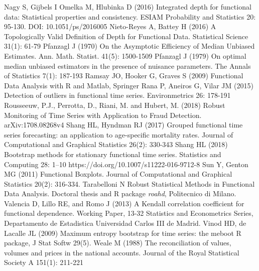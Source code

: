 \documentclass[12pt,a4paper]{article}
\numberwithin{equation}{section}
\begin{document}
\begin{thebibliography}{}
 Nagy S, Gijbels I Omelka M, Hlubinka D (2016) Integrated depth for functional data: Statistical     
properties and consistency. ESIAM Probability and Statistics 20: 95-130.
DOI: 10.1051/ps/2016005
 Nieto-Reyes A, Battey H (2016) A Topologically Valid Definition of Depth for Functional Data. Statistical Science 31(1): 61-79
 Pfanzagl J (1970) On the Asymptotic Efficiency of Median Unbiased Estimates. Ann. Math. Statist. 41(5): 1500-1509
 Pfanzagl J (1979) On optimal median unbiased estimators in the presence of nuisance parameters. The Annals of Statistics 7(1): 187-193
 Ramsay JO, Hooker G, Graves S (2009) Functional Data Analysis with R and Matlab, Springer
 Rana P, Aneiros G, Vilar JM (2015) Detection of outliers in functional time series. Environmetrics 26: 178-191
 Rousseeuw, P.J., Perrotta, D., Riani, M. and Hubert, M. (2018) Robust Monitoring of Time Series with Application to Fraud Detection. arXiv:1708.08268v4
 Shang HL, Hyndman RJ (2017) Grouped functional time series forecasting: an application to age-specific mortality rates. Journal of Computational and Graphical Statistics 26(2): 330-343 
 Shang HL (2018) Bootstrap methods for stationary functional time series. Statistics and Computing  28: 1–10
https://doi.org/10.1007/s11222-016-9712-8
 Sun Y, Genton MG (2011) Functional Boxplots. Journal of Computational and Graphical Statistics  20(2):  316-334. 
 Tarabelloni N Robust Statistical Methods in Functional Data Analysis. Doctoral thesis and R package \emph{roahd}, Politecnico di Milano.
 Valencia D, Lillo RE, and Romo J (2013) A Kendall correlation coefficient for functional dependence.
Working Paper, 13-32
Statistics and Econometrics Series, Departamento de Estadistica Universidad Carlos III de Madrid.
 Vinod HD, de Lacalle JL (2009) Maximum entropy bootstrap for time series: the meboot R package, J Stat Softw 29(5).
 Weale M (1988) The reconciliation of values, volumes and prices in the national accounts. Journal of the Royal Statistical Society A 151(1): 211-221
\end{thebibliography}
\end{document}
